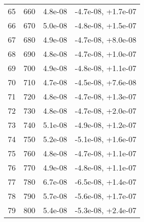 \begin{table}
\begin{adjustbox}{width=1\textwidth/2}
\begin{tabular}{|c|c|c|c|}
\cline{1-4}
65 & 660 & 4.8e-08 & -4.7e-08, +1.7e-07 \\
\cline{1-4}
66 & 670 & 5.0e-08 & -4.8e-08, +1.5e-07 \\
\cline{1-4}
67 & 680 & 4.9e-08 & -4.7e-08, +8.0e-08 \\
\cline{1-4}
68 & 690 & 4.8e-08 & -4.7e-08, +1.0e-07 \\
\cline{1-4}
69 & 700 & 4.9e-08 & -4.8e-08, +1.1e-07 \\
\cline{1-4}
70 & 710 & 4.7e-08 & -4.5e-08, +7.6e-08 \\
\cline{1-4}
71 & 720 & 4.8e-08 & -4.7e-08, +1.3e-07 \\
\cline{1-4}
72 & 730 & 4.8e-08 & -4.7e-08, +2.0e-07 \\
\cline{1-4}
73 & 740 & 5.1e-08 & -4.9e-08, +1.2e-07 \\
\cline{1-4}
74 & 750 & 5.2e-08 & -5.1e-08, +1.6e-07 \\
\cline{1-4}
75 & 760 & 4.8e-08 & -4.7e-08, +1.1e-07 \\
\cline{1-4}
76 & 770 & 4.9e-08 & -4.8e-08, +1.1e-07 \\
\cline{1-4}
77 & 780 & 6.7e-08 & -6.5e-08, +1.4e-07 \\
\cline{1-4}
78 & 790 & 5.7e-08 & -5.6e-08, +1.7e-07 \\
\cline{1-4}
79 & 800 & 5.4e-08 & -5.3e-08, +2.4e-07 \\
\cline{1-4}
\end{tabular}
\end{adjustbox}
\end{table}

